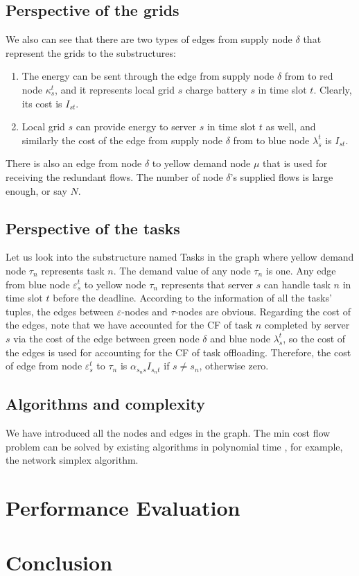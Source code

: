 \documentclass[conference, 10pt, ﬁnal, letterpaper, twocolumn]{IEEEtran}
\begin{document}
\subsection{Perspective of the grids}

We also can see that there are two types of edges from supply node $\delta$ that represent the grids to the substructures:
\begin{enumerate}
    \item The energy can be sent through the edge from supply node $\delta$ from to red node $\kappa^{t}_{s}$, and it represents local grid $s$ charge battery $s$ in time slot $t$. Clearly, its cost is $I_{st}$.
    \item Local grid $s$ can provide energy to server $s$ in time slot $t$ as well, and similarly the cost of the edge from supply node $\delta$ from to blue node $\lambda^{t}_{s}$ is $I_{st}$.
\end{enumerate}
There is also an edge from node $\delta$ to yellow demand node $\mu$ that is used for receiving the redundant flows. The number of node $\delta$'s supplied flows is large enough, or say $N$. 

\subsection{Perspective of the tasks}

Let us look into the substructure named Tasks in the graph where yellow demand node $\tau_n$ represents task $n$. The demand value of any node $\tau_n$ is one. Any edge from blue node $\varepsilon^{t}_{s}$ to yellow node $\tau_{n}$ represents that server $s$ can handle task $n$ in time slot $t$ before the deadline. According to the information of all the tasks' tuples, the edges between $\varepsilon$-nodes and $\tau$-nodes are obvious. Regarding the cost of the edges, note that we have accounted for the CF of task $n$ completed by server $s$ via the cost of the edge between green node $\delta$ and blue node $\lambda^{t}_{s}$, so the cost of the edges is used for accounting for the CF of task offloading. Therefore, the cost of edge from node $\varepsilon^{t}_{s}$ to $\tau_n$ is $\alpha_{s_{n}s}I_{s_{n}t}$ if ${s}\neq{s_{n}}$, otherwise zero.

\subsection{Algorithms and complexity}

We have introduced all the nodes and edges in the graph. The min cost flow problem can be solved by existing algorithms in polynomial time \cite{10.5555/137406}, for example, the network simplex algorithm.

\section{Performance Evaluation}

\section{Conclusion} \label{Sec:conclusion}




\end{document}
